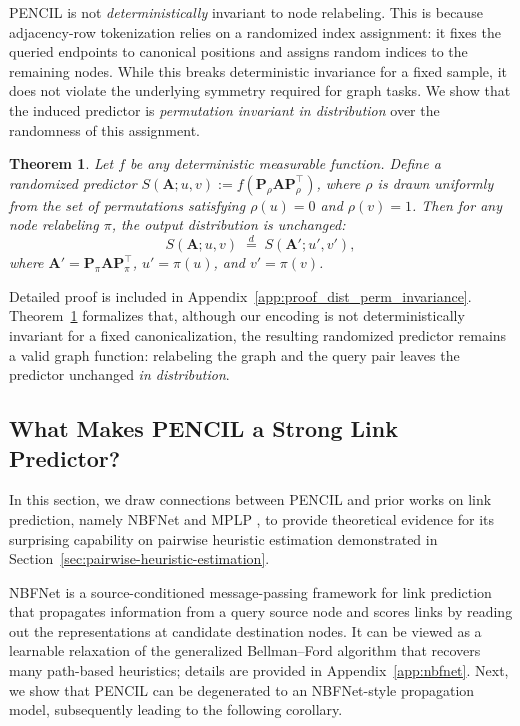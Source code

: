 \documentclass{article}
\theoremstyle{plain}
\newtheorem{theorem}{Theorem}[section]
\theoremstyle{definition}
\theoremstyle{remark}
\begin{document}
PENCIL is not \emph{deterministically} invariant to node relabeling. This is because adjacency-row tokenization relies on a randomized index assignment: it fixes the queried endpoints to canonical positions and assigns random indices to the remaining nodes. While this breaks deterministic invariance for a fixed sample, it does not violate the underlying symmetry required for graph tasks. We show that the induced predictor is \emph{permutation invariant in distribution} over the randomness of this assignment.

\begin{theorem}\label{thm:dist_perm_invariance}
Let $f$ be any deterministic measurable function. Define a randomized predictor
$S(\mathbf{A}; u, v) := f(\mathbf{P}_\rho \mathbf{A} \mathbf{P}_\rho^\top)$,
where $\rho$ is drawn uniformly from the set of permutations satisfying $\rho(u)=0$ and $\rho(v)=1$.
Then for any node relabeling $\pi$, the output distribution is unchanged:
\[
    S(\mathbf{A}; u, v) \;\overset{d}{=}\; S(\mathbf{A}'; u', v'),
\]
where $\mathbf{A}' = \mathbf{P}_\pi \mathbf{A} \mathbf{P}_\pi^\top$, $u' = \pi(u)$, and $v' = \pi(v)$.
\end{theorem}

Detailed proof is included in Appendix~\ref{app:proof_dist_perm_invariance}. Theorem~\ref{thm:dist_perm_invariance} formalizes that, although our encoding is not deterministically invariant for a fixed canonicalization, the resulting randomized predictor remains a valid graph function: relabeling the graph and the query pair leaves the predictor unchanged \emph{in distribution}. 

\subsection{What Makes PENCIL a Strong Link Predictor?}

In this section, we draw connections between PENCIL and prior works on link prediction, namely NBFNet \cite{zhu_neural_bellman-ford_2021} and MPLP \cite{dong_pure_2024}, to provide theoretical evidence for its surprising capability on pairwise heuristic estimation demonstrated in Section~\ref{sec:pairwise-heuristic-estimation}. 


NBFNet \cite{zhu_neural_bellman-ford_2021} is a source-conditioned message-passing framework \cite{you2021identity} for link prediction that propagates information from a query source node and scores links by reading out the representations at candidate destination nodes. It can be viewed as a learnable relaxation of the generalized Bellman--Ford algorithm that recovers many path-based heuristics; details are provided in Appendix~\ref{app:nbfnet}. Next, we show that PENCIL can be degenerated to an NBFNet-style propagation model, subsequently leading to the following corollary.
\end{document}
